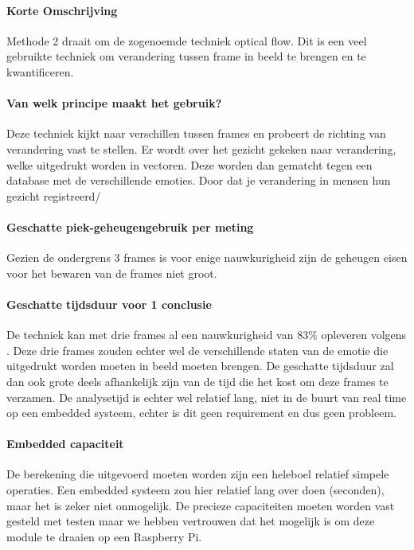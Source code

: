\documentclass[11pt]{article}
\begin{document}
    \paragraph{Korte Omschrijving}
    Methode 2 draait om de zogenoemde techniek optical flow.
    Dit is een veel gebruikte techniek om verandering tussen frame in beeld te brengen en te kwantificeren.

    \paragraph{Van welk principe maakt het gebruik?}
    Deze techniek kijkt naar verschillen tussen frames en probeert de richting van verandering vast te stellen.
    Er wordt over het gezicht gekeken naar verandering, welke uitgedrukt worden in vectoren.
    Deze worden dan gematcht tegen een database met de verschillende emoties.
    Door dat je verandering in mensen hun gezicht registreerd/

    \paragraph{Geschatte piek-geheugengebruik per meting}
    Gezien de ondergrens 3 frames is voor enige nauwkurigheid zijn de geheugen eisen voor het bewaren van de frames niet groot. 

    \paragraph{Geschatte tijdsduur voor 1 conclusie}
    De techniek kan met drie frames al een nauwkurigheid van 83\% opleveren volgens \emph{\citet{naghsh2006efficient}}.
    Deze drie frames zouden echter wel de verschillende staten van de emotie die uitgedrukt worden moeten in beeld moeten brengen.
    De geschatte tijdsduur zal dan ook grote deels afhankelijk zijn van de tijd die het kost om deze frames te verzamen.
    De analysetijd is echter wel relatief lang, niet in de buurt van real time op een embedded systeem, echter is dit geen requirement en dus geen probleem.

    \paragraph{Embedded capaciteit}
    De berekening die uitgevoerd moeten worden zijn een heleboel relatief simpele operaties.
    Een embedded systeem zou hier relatief lang over doen (seconden), maar het is zeker niet onmogelijk.
    De precieze capaciteiten moeten worden vast gesteld met testen maar we hebben vertrouwen dat het mogelijk is om deze module te draaien op een Raspberry Pi.
\end{document}
